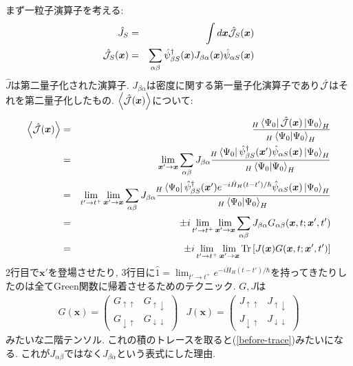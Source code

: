 \documentclass[10.5pt,a4paper]{jreport}
\begin{document}
まず一粒子演算子を考える:
\begin{eqnarray}
  \hat{J}_S &=& \int d\bm{x} {\cal \hat{J}}_S(\bm{x})\\
  \hat{{\cal J}}_S(\bm{x}) &=& \sum_{\alpha\beta}\hat{\psi}_{\beta S}^\dagger(\bm{x})J_{\beta\alpha}(\bm{x})\hat{\psi}_{\alpha S}(\bm{x})
\end{eqnarray}
$\hat{J}$は第二量子化された演算子. $J_{\beta\alpha}$は密度に関する第一量子化演算子であり$\hat{{\cal J}}$はそれを第二量子化したもの. $\ev{\hat{\cal{J}}(\bm{x})}$について:
\begin{eqnarray}
  \ev{\hat{\cal J}(\bm{x})} &=& \frac{\!_H\bra{\Psi_0}\hat{\cal J}(\bm{x})\ket{\Psi_0}_H}{\!_H\bra{\Psi_0}\ket{\Psi_0}_H} \\
  &=& \lim_{\bm{x}'\rightarrow\bm{x}}\sum_{\alpha\beta}J_{\beta\alpha}\frac{\!_H\bra{\Psi_0}\hat{\psi}^\dagger_{\beta S}(\bm{x}')\hat{\psi}_{\alpha S}(\bm{x})\ket{\Psi_0}_H}{\!_H\bra{\Psi_0}\ket{\Psi_0}_H} \\
  &=& \lim_{t'\rightarrow t^+}\lim_{\bm{x}'\rightarrow\bm{x}}\sum_{\alpha\beta}J_{\beta\alpha}\frac{\!_H\bra{\Psi_0}\hat{\psi}^\dagger_{\beta S}(\bm{x}')e^{-i\hat{H}_H(t-t')/\hbar}\hat{\psi}_{\alpha S}(\bm{x})\ket{\Psi_0}_H}{\!_H\bra{\Psi_0}\ket{\Psi_0}_H} \\
  &=& \pm i\lim_{t'\rightarrow t^+}\lim_{\bm{x}'\rightarrow\bm{x}}\sum_{\alpha\beta}J_{\beta\alpha}G_{\alpha\beta}(\bm{x}, t; \bm{x}', t')\label{before-trace}\\
  &=& \pm i\lim_{t'\rightarrow t^+}\lim_{\bm{x}'\rightarrow\bm{x}}\Tr\qty[J(\bm{x})G(\bm{x}, t; \bm{x}', t')]
\end{eqnarray}
2行目で$\bm{x}'$を登場させたり, 3行目に$\hat{1} = \lim_{t'\rightarrow t^+}e^{-iH_H(t - t')/\hbar}$を持ってきたりしたのは全てGreen関数に帰着させるためのテクニック. $G, J$は
\begin{eqnarray}
    G(\bm{x}) =
  \begin{pmatrix}
    G_{\uparrow\uparrow} & G_{\uparrow\downarrow}\\
    G_{\downarrow\uparrow} & G_{\downarrow\downarrow}
  \end{pmatrix} &  J(\bm{x}) =
  \begin{pmatrix}
    J_{\uparrow\uparrow} & J_{\uparrow\downarrow}\\
    J_{\downarrow\uparrow} & J_{\downarrow\downarrow}
  \end{pmatrix}
\end{eqnarray}
みたいな二階テンソル. これの積のトレースを取ると(\ref{before-trace})みたいになる. これが$J_{\alpha\beta}$ではなく$J_{\beta\alpha}$という表式にした理由.
\end{document}
